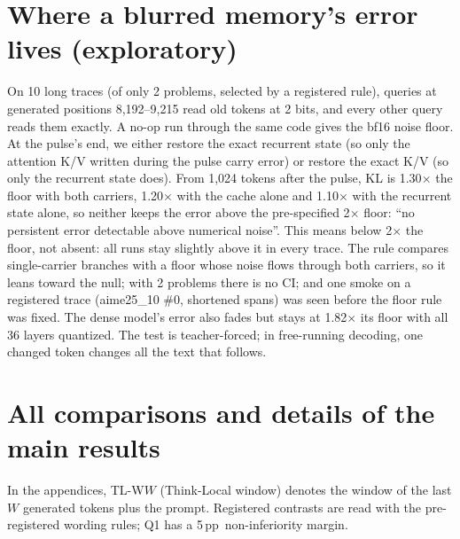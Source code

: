 \documentclass{article}
\newcommand{\pp}{\,pp}
\begin{document}
\section{Where a blurred memory's error lives (exploratory)}
\label{app:pulse}
On 10 long traces (of only 2 problems, selected by a registered rule), queries at generated positions 8,192--9,215 read old tokens at 2 bits, and every other query reads them exactly. A no-op run through the same code gives the bf16 noise floor. At the pulse's end, we either restore the exact recurrent state (so only the attention K/V written during the pulse carry error) or restore the exact K/V (so only the recurrent state does). From 1,024 tokens after the pulse, KL is 1.30$\times$ the floor with both carriers, 1.20$\times$ with the cache alone and 1.10$\times$ with the recurrent state alone, so neither keeps the error above the pre-specified 2$\times$ floor: ``no persistent error detectable above numerical noise''. This means below 2$\times$ the floor, not absent: all runs stay slightly above it in every trace. The rule compares single-carrier branches with a floor whose noise flows through both carriers, so it leans toward the null; with 2 problems there is no CI; and one smoke on a registered trace (aime25\_10 \#0, shortened spans) was seen before the floor rule was fixed. The dense model's error also fades but stays at 1.82$\times$ its floor with all 36 layers quantized. The test is teacher-forced; in free-running decoding, one changed token changes all the text that follows.

\section{All comparisons and details of the main results}
\label{app:details}
In the appendices, TL-W$W$ (Think-Local window) denotes the window of the last $W$ generated tokens plus the prompt. Registered contrasts are read with the pre-registered wording rules; Q1 has a 5\pp\ non-inferiority margin.
\end{document}
